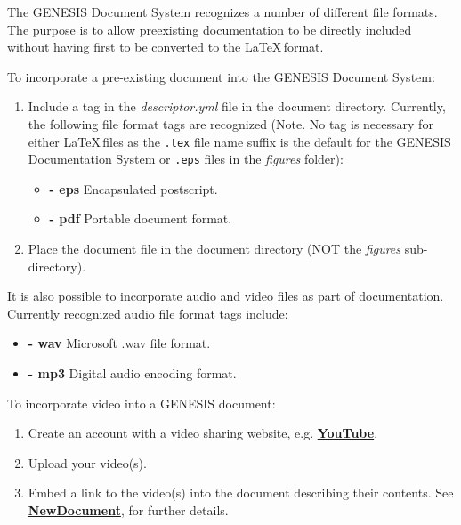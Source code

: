 \documentclass[12pt]{article}
\begin{document}
The GENESIS Document System recognizes a number of different file formats. The purpose is to allow preexisting documentation to be directly included without having first to be converted to the \LaTeX\,format.

To incorporate a pre-existing document into the GENESIS Document System:

\begin{enumerate}

\item Include a tag in the {\it descriptor.yml} file in the document directory. Currently, the following file format tags are recognized (Note. No tag is necessary for either \LaTeX\,files as the {\tt .tex} file name suffix is the default for the GENESIS Documentation System or {\tt .eps} files in the {\it figures} folder):

\begin{itemize}

\item[]{\bf - eps} Encapsulated postscript.
\item[]{\bf - pdf} Portable document format.

\end{itemize}

\item Place the document file in the document directory (NOT the {\it figures} sub-directory).

\end{enumerate}

It is also possible to incorporate audio and video files as part of documentation. Currently recognized audio file format tags include:

\begin{itemize}
   \item[]{\bf - wav} Microsoft .wav file format.
   \item[]{\bf - mp3} Digital audio encoding format.
\end{itemize}

To incorporate video into a GENESIS document: 

\begin{enumerate}
   \item Create an account with a video sharing website, e.g. \href{http://www.youtube.com/create_account}{\bf YouTube}.
   \item Upload your video(s).
   \item Embed a link to the video(s) into the document describing their contents. See \href{../NewDocument/NewDocument.tex}{\bf NewDocument}, for further details.
\end{enumerate}
\end{document}
